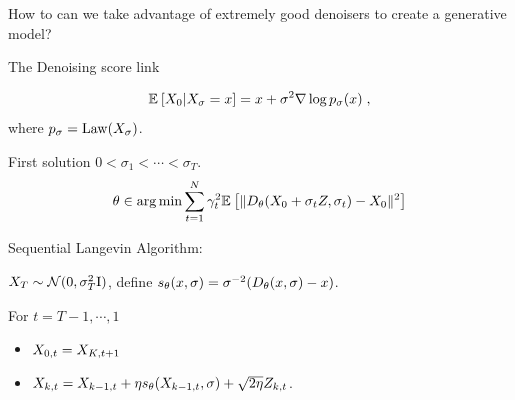 \documentclass[10pt]{beamer}
\begin{document}
\begin{frame}
    How to can we take advantage of extremely good denoisers to create a generative model?
\end{frame}
\begin{frame}{The Denoising score link}
  \vspace{-100pt}
  \begin{lemma}
    \begin{equation}
      \mathbb{E}_{}\left[X_0 | X_{\sigma}=x\right] = x + \sigma^2 \nabla \log p_{\sigma}(x) \;,
  \end{equation}
  where $p_{\sigma} = \operatorname{Law}(X_\sigma)$.  
  \end{lemma}
\end{frame}
\begin{frame}{First solution \citep{song2019generative}}
    $0 < \sigma_1 < \cdots < \sigma_T$.
    \begin{equation}
        \theta \in \arg\min \sum_{t=1}^{N} \gamma_t^2 \mathbb{E}_{}\left[\|D_{\theta}(X_0 + \sigma_t Z, \sigma_t) - X_0\|^2\right]
    \end{equation}
    \pause

    Sequential Langevin Algorithm: 
    \vspace{10pt}
    
    $X_{T} \sim \mathcal{N}(0, \sigma_T^2\mathrm{I})$, define $s_{\theta}(x, \sigma) = \sigma^{-2}(D_{\theta}(x, \sigma) - x)$.
    \vspace{10pt}
    \pause

    For $t=T-1, \cdots, 1$
    \begin{itemize}
      \item $X_{0, t} = X_{K, t+1}$
      \item $X_{k, t} = X_{k-1, t} + \eta s_{\theta}(X_{k-1, t}, \sigma) + \sqrt{2 \eta} Z_{k, t}$. 
    \end{itemize}
\end{frame}
\end{document}
